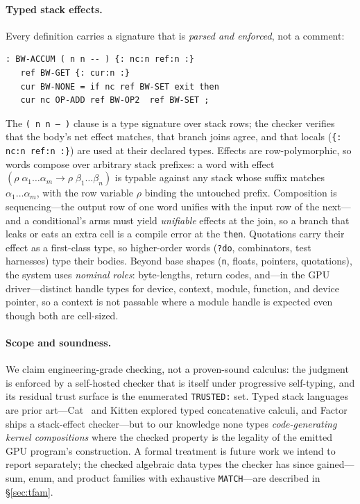 \documentclass[11pt]{article}
\newcommand{\code}[1]{\texttt{#1}}
\begin{document}
\paragraph{Typed stack effects.} Every definition carries a signature that
is \emph{parsed and enforced}, not a comment:
\begin{verbatim}
: BW-ACCUM ( n n -- ) {: nc:n ref:n :}
   ref BW-GET {: cur:n :}
   cur BW-NONE = if nc ref BW-SET exit then
   cur nc OP-ADD ref BW-OP2  ref BW-SET ;
\end{verbatim}
The \code{( n n -- )} clause is a type signature over stack rows; the
checker verifies that the body's net effect matches, that branch joins
agree, and that locals (\code{\{: nc:n ref:n :\}}) are used at their
declared types. Effects are row-polymorphic, so words compose over
arbitrary stack prefixes: a word with effect
$(\rho\;\alpha_1\ldots\alpha_m \to \rho\;\beta_1\ldots\beta_n)$
is typable against any stack whose suffix matches
$\alpha_1\ldots\alpha_m$, with the row variable $\rho$ binding the
untouched prefix. Composition is sequencing---the output row of one word
unifies with the input row of the next---and a conditional's arms must
yield \emph{unifiable} effects at the join, so a branch that leaks or
eats an extra cell is a compile error at the \code{then}. Quotations
carry their effect as a first-class type, so higher-order words
(\code{?do}, combinators, test harnesses) type their bodies. Beyond base
shapes (\code{n}, floats,
pointers, quotations), the system uses \emph{nominal roles}: byte-lengths,
return codes, and---in the GPU driver---distinct handle types for device,
context, module, function, and device pointer, so a context is not
passable where a module handle is expected even though both are
cell-sized.

\paragraph{Scope and soundness.} We claim engineering-grade checking,
not a proven-sound calculus: the judgment is enforced by a self-hosted
checker that is itself under progressive self-typing, and its residual
trust surface is the enumerated \code{TRUSTED:} set. Typed stack
languages are prior art---Cat~\cite{cat} and Kitten explored typed
concatenative calculi, and Factor ships a stack-effect checker---but to
our knowledge none types \emph{code-generating kernel compositions}
where the checked property is the legality of the emitted GPU program's
construction. A formal treatment is future work we intend to report
separately; the checked algebraic data types the checker has since
gained---sum, enum, and product families with exhaustive \code{MATCH}---are
described in \S\ref{sec:tfam}.
\end{document}
